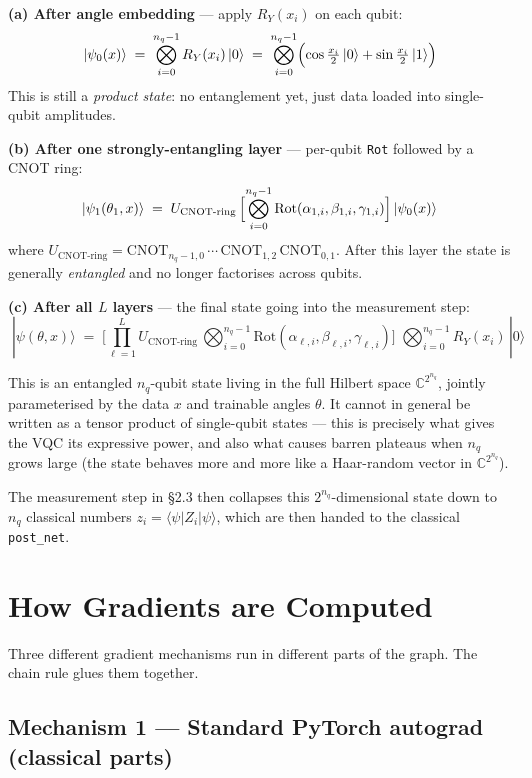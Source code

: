 \documentclass[11pt,a4paper]{article}
\begin{document}
\textbf{(a) After angle embedding} --- apply $R_Y(x_i)$ on each qubit:
\[
  |\psi_0(x)\rangle \;=\; \bigotimes_{i=0}^{n_q-1} R_Y(x_i)\,|0\rangle
  \;=\; \bigotimes_{i=0}^{n_q-1}\Bigl(\cos\tfrac{x_i}{2}\,|0\rangle + \sin\tfrac{x_i}{2}\,|1\rangle\Bigr)
\]
This is still a \emph{product state}: no entanglement yet, just data loaded into single-qubit amplitudes.

\textbf{(b) After one strongly-entangling layer} --- per-qubit \texttt{Rot} followed by a CNOT ring:
\[
  |\psi_1(\theta_1, x)\rangle \;=\; U_{\text{CNOT-ring}}\,\Bigl[\bigotimes_{i=0}^{n_q-1}\mathrm{Rot}(\alpha_{1,i}, \beta_{1,i}, \gamma_{1,i})\Bigr]\,|\psi_0(x)\rangle
\]
where $U_{\text{CNOT-ring}} = \text{CNOT}_{n_q-1, 0}\,\cdots\,\text{CNOT}_{1, 2}\,\text{CNOT}_{0, 1}$. After this layer the state is generally \emph{entangled} and no longer factorises across qubits.

\textbf{(c) After all $L$ layers} --- the final state going into the measurement step:
\[
  \boxed{\;
  |\psi(\theta, x)\rangle \;=\; \biggl[\prod_{\ell=1}^{L} U_{\text{CNOT-ring}}\,\bigotimes_{i=0}^{n_q-1}\mathrm{Rot}(\alpha_{\ell,i}, \beta_{\ell,i}, \gamma_{\ell,i})\biggr]\;\bigotimes_{i=0}^{n_q-1} R_Y(x_i)\,|0\rangle
  \;}
\]

This is an entangled $n_q$-qubit state living in the full Hilbert space $\mathbb{C}^{2^{n_q}}$, jointly parameterised by the data $x$ and trainable angles $\theta$. It cannot in general be written as a tensor product of single-qubit states --- this is precisely what gives the VQC its expressive power, and also what causes barren plateaus when $n_q$ grows large (the state behaves more and more like a Haar-random vector in $\mathbb{C}^{2^{n_q}}$).

The measurement step in \S2.3 then collapses this $2^{n_q}$-dimensional state down to $n_q$ classical numbers $z_i = \langle\psi|Z_i|\psi\rangle$, which are then handed to the classical \texttt{post\_net}.

\section{How Gradients are Computed}

Three different gradient mechanisms run in different parts of the graph.
The chain rule glues them together.

\subsection{Mechanism 1 --- Standard PyTorch autograd (classical parts)}
\end{document}
